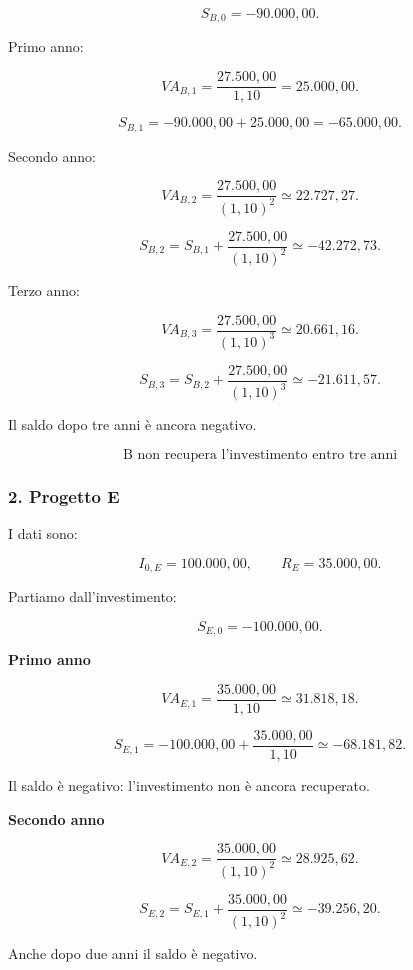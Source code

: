 \[
S_{B,0}=-90.000{,}00.
\]

\noindent Primo anno:

\[
VA_{B,1}
=
\frac{27.500{,}00}{1{,}10}
=
25.000{,}00.
\]

\[
S_{B,1}
=
-90.000{,}00+25.000{,}00
=
\boxed{-65.000{,}00}.
\]

\noindent Secondo anno:

\[
VA_{B,2}
=
\frac{27.500{,}00}{(1{,}10)^2}
\simeq22.727{,}27.
\]

\[
S_{B,2}
=
S_{B,1}
+
\frac{27.500{,}00}{(1{,}10)^2}
\simeq
\boxed{-42.272{,}73}.
\]

\noindent Terzo anno:

\[
VA_{B,3}
=
\frac{27.500{,}00}{(1{,}10)^3}
\simeq20.661{,}16.
\]

\[
S_{B,3}
=
S_{B,2}
+
\frac{27.500{,}00}{(1{,}10)^3}
\simeq
\boxed{-21.611{,}57}.
\]

\noindent Il saldo dopo tre anni
è ancora negativo.

\[
\boxed{
\text{B non recupera l'investimento entro tre anni}
}
\]


\subsubsection*{2. Progetto E}

\noindent I dati sono:

\[
I_{0,E}=100.000{,}00,
\qquad
R_E=35.000{,}00.
\]

\noindent Partiamo dall'investimento:

\[
S_{E,0}=-100.000{,}00.
\]

\medskip

\noindent \textbf{Primo anno}

\[
VA_{E,1}
=
\frac{35.000{,}00}{1{,}10}
\simeq31.818{,}18.
\]

\[
S_{E,1}
=
-100.000{,}00
+
\frac{35.000{,}00}{1{,}10}
\simeq
\boxed{-68.181{,}82}.
\]

\noindent Il saldo è negativo:
l'investimento non è ancora recuperato.

\medskip

\noindent \textbf{Secondo anno}

\[
VA_{E,2}
=
\frac{35.000{,}00}{(1{,}10)^2}
\simeq28.925{,}62.
\]

\[
S_{E,2}
=
S_{E,1}
+
\frac{35.000{,}00}{(1{,}10)^2}
\simeq
\boxed{-39.256{,}20}.
\]

\noindent Anche dopo due anni
il saldo è negativo.

\medskip

